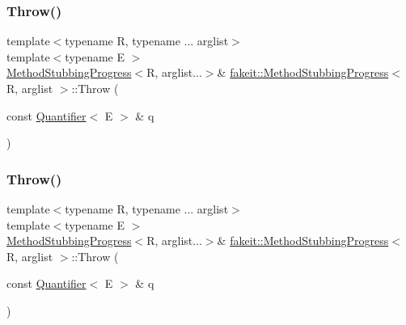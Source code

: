 \mbox{\label{structfakeit_1_1MethodStubbingProgress_a93c74210adfc0ec4662aff15f78834c7}} 
\subsubsection{\texorpdfstring{Throw()}{Throw()}\hspace{0.1cm}{\footnotesize\ttfamily [9/27]}}
{\footnotesize\ttfamily template$<$typename R, typename ... arglist$>$ \\
template$<$typename E $>$ \\
\mbox{\hyperlink{structfakeit_1_1MethodStubbingProgress}{Method\+Stubbing\+Progress}}$<$R, arglist...$>$\& \mbox{\hyperlink{structfakeit_1_1MethodStubbingProgress}{fakeit\+::\+Method\+Stubbing\+Progress}}$<$ R, arglist $>$\+::Throw (\begin{DoxyParamCaption}\item[{const \mbox{\hyperlink{structfakeit_1_1Quantifier}{Quantifier}}$<$ E $>$ \&}]{q }\end{DoxyParamCaption})\hspace{0.3cm}{\ttfamily [inline]}}

\mbox{\label{structfakeit_1_1MethodStubbingProgress_a93c74210adfc0ec4662aff15f78834c7}} 
\subsubsection{\texorpdfstring{Throw()}{Throw()}\hspace{0.1cm}{\footnotesize\ttfamily [10/27]}}
{\footnotesize\ttfamily template$<$typename R, typename ... arglist$>$ \\
template$<$typename E $>$ \\
\mbox{\hyperlink{structfakeit_1_1MethodStubbingProgress}{Method\+Stubbing\+Progress}}$<$R, arglist...$>$\& \mbox{\hyperlink{structfakeit_1_1MethodStubbingProgress}{fakeit\+::\+Method\+Stubbing\+Progress}}$<$ R, arglist $>$\+::Throw (\begin{DoxyParamCaption}\item[{const \mbox{\hyperlink{structfakeit_1_1Quantifier}{Quantifier}}$<$ E $>$ \&}]{q }\end{DoxyParamCaption})\hspace{0.3cm}{\ttfamily [inline]}}

